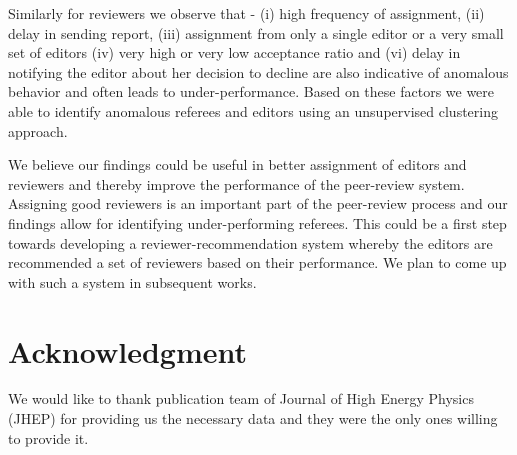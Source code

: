Similarly for reviewers we observe that - 
(i) high frequency of assignment, (ii) delay in sending report, (iii) assignment from only a single editor or a very small set of editors (iv) 
very high or very low acceptance ratio and (vi) delay in notifying the editor about her decision to decline are also indicative of anomalous behavior and often leads to under-performance. Based on these factors we were able to identify anomalous referees and editors using an unsupervised clustering approach. 

 We believe our findings could be useful in better assignment of editors and reviewers and thereby improve the performance of the peer-review system. Assigning good reviewers is an important part of the peer-review process and our findings allow for identifying under-performing referees. This could be a first step towards developing a reviewer-recommendation system whereby the editors are recommended a set of reviewers based on their performance. 
We plan to come up with such a system in subsequent works.

%
\section*{Acknowledgment}
We would like to thank publication team of Journal of High Energy Physics (JHEP) for providing us the necessary data and they were the only ones willing to provide it.

%
%

